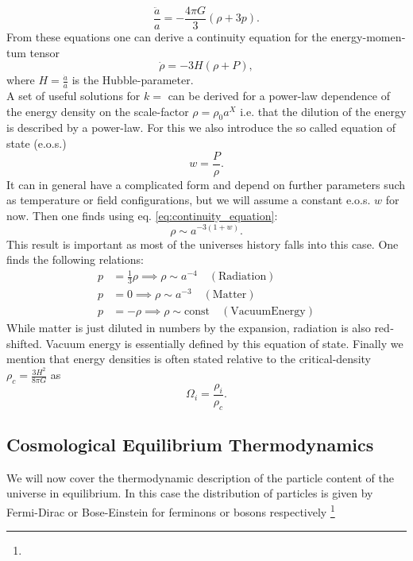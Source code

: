 \documentclass[master,       %
               twoside,        %
               BCOR10mm,       %
               english,ngerman, %
               ]{GAUBM}
\begin{document}
\begin{otherlanguage}{english}
{}
\begin{equation}
	\frac{\ddot{a}}{a} = - \frac{4 \pi G}{3} ( \rho + 3 p ).
\end{equation}
From these equations one can derive a continuity equation for the energy-momentum tensor
\begin{equation}
	\label{eq:continuity_equation}
	\dot{\rho} = - 3 H (\rho + P),
\end{equation}
where $H = \frac{\dot{a}}{a}$ is the Hubble-parameter. \\
\noindent A set of useful solutions for $k = $ can be derived for a power-law dependence of the energy density on the scale-factor $\rho = \rho_0 a^X$ i.e. that the dilution of the energy is described by a power-law. For this we also introduce the so called equation of state (e.o.s.)
\begin{equation}
	w = \frac{P}{\rho}.
\end{equation}
It can in general have a complicated form and depend on further parameters such as temperature or field configurations, but we will assume a constant e.o.s. $w$ for now.
Then one finds using eq. \eqref{eq:continuity_equation}:
\begin{equation}
	\rho \sim a^{-3(1 + w)}.
\end{equation}
This result is important as most of the universes history falls into this case.
One finds the following relations:
\begin{align}
	p &= \frac{1}{3} \rho \implies \rho \sim a^{-4} \quad \mathrm{(Radiation)} \nonumber \\
	p &= 0 \implies \rho \sim a^{-3} \quad \mathrm{(Matter)} \nonumber \\
	p &= - \rho \implies \rho \sim \mathrm{const} \quad \mathrm{(Vacuum Energy)}
\end{align}
While matter is just diluted in numbers by the expansion, radiation is also redshifted.
Vacuum energy is essentially defined by this equation of state.
Finally we mention that energy densities is often stated relative to the critical-density $\rho_c = \frac{3 H^2}{8 \pi G}$ as
\begin{equation}
	\Omega_i = \frac{\rho_i}{\rho_c}.
\end{equation}

\subsection{Cosmological Equilibrium Thermodynamics}
We will now cover the thermodynamic description of the particle content of the universe
in equilibrium.
In this case the distribution of particles is given by Fermi-Dirac or Bose-Einstein for ferminons or bosons respectively \footnote{

}
\end{otherlanguage}
\end{document}

